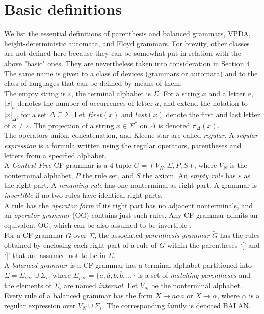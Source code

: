 \documentclass[3p,11pt]{elsarticle}
\begin{document}
\section{Basic definitions}\label{SectBasicDef}
We list the essential definitions of parenthesis and balanced grammars, VPDA, height-deterministic automata, and Floyd grammars. For brevity, other classes are not defined here because they can be somewhat put in relation with the above "basic" ones. They are nevertheless taken into consideration in Section 4. The same name is given to a class of devices (grammars or automata) and to the class of languages that can be defined by means of them.
\\
The empty string is $\varepsilon$, the terminal alphabet is $\Sigma$. For a string $x$ and a letter $a$, $|x|_a$ denotes the number of occurrences of letter $a$, and extend the notation to $|x|_{\Delta}$, for a set $\Delta\subseteq\Sigma$. Let $first(x)$ and $last(x)$ denote the first and last letter of $x\neq \varepsilon$. The projection of a string $x \in \Sigma^{\ast}$ on $\Delta$ is denoted $\pi_\Delta(x)$.
\\
The operators union, concatenation, and Kleene star are called \emph{regular}. A \emph{regular expression} is a formula written using the regular operators, parentheses and letters from a specified alphabet.
\\
A \emph{Context-Free} CF grammar is  a 4-tuple $G=(V_N, \Sigma, P, S)$, where $V_N$ is the nonterminal alphabet, $P$ the rule set, and $S$ the axiom. An \emph{empty rule} has $\varepsilon$ as the right part. A \emph{renaming rule} has one nonterminal as right part. A grammar is \emph{invertible} if no two rules have identical right parts.
\\
A rule has the \emph{operator form} if its right part has no adjacent nonterminals, and an \emph{operator grammar} (OG) contains just such rules. Any CF grammar admits an equivalent OG, which can be also assumed to be invertible \cite{Harrison78}.
\\
For a CF grammar $G$ over $\Sigma$,  the associated \emph{parenthesis grammar} \cite{McNaughton67} $\widetilde{G}$  has the rules  obtained by enclosing each right part of a rule of $G$ within the parentheses `$[$' and `$]$' that are assumed not to be in $\Sigma$.
\\
A \emph{balanced grammar} \cite{Berstel:2001:BGT} is a CF grammar  has a terminal alphabet partitioned into $\Sigma =\Sigma_{par}\cup \Sigma_i$, where $\Sigma_{par}=\{a,\overline{a},b,\overline{b}, \ldots\}$ is a set of \emph{matching parentheses} and the elements of $\Sigma_i$ are named \emph{internal}. Let $V_N$ be the nonterminal alphabet. Every rule of a balanced grammar has the form $X\to a \alpha \overline{a}$ or $X\to \alpha $, where $\alpha$ is a regular expression over $V_N\cup \Sigma_i$. The corresponding family is denoted BALAN.
\end{document}
